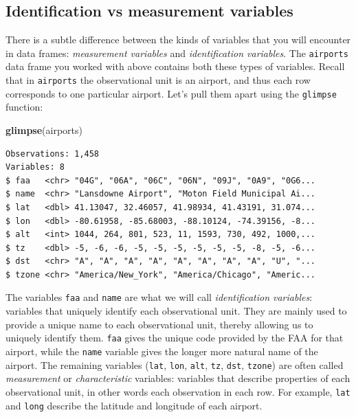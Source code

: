 \documentclass[12pt,]{krantz}
\makeatletter
\newenvironment{Shaded}{\begin{snugshade}}{\end{snugshade}}
\newcommand{\KeywordTok}[1]{\textcolor[rgb]{0.27,0.27,0.27}{\textbf{#1}}}
\newcommand{\NormalTok}[1]{#1}
\newenvironment{kframe}{%
\medskip{}
\setlength{\fboxsep}{.8em}
 \def\at@end@of@kframe{}%
 \ifinner\ifhmode%
  \def\at@end@of@kframe{\end{minipage}}%
  \begin{minipage}{\columnwidth}%
 \fi\fi%
 \def\FrameCommand##1{\hskip\@totalleftmargin \hskip-\fboxsep
 \colorbox{shadecolor}{##1}\hskip-\fboxsep
     \hskip-\linewidth \hskip-\@totalleftmargin \hskip\columnwidth}%
 \MakeFramed {\advance\hsize-\width
   \@totalleftmargin\z@ \linewidth\hsize
   \@setminipage}}%
 {\par\unskip\endMakeFramed%
 \at@end@of@kframe}
\renewenvironment{Shaded}{\begin{kframe}}{\end{kframe}}
\theoremstyle{definition}
\theoremstyle{definition}
\theoremstyle{definition}
\theoremstyle{remark}
\makeatother
\begin{document}
\subsection{Identification vs measurement
variables}\label{identification-vs-measurement}

There is a subtle difference between the kinds of variables that you
will encounter in data frames: \emph{measurement variables} and
\emph{identification variables}. The \texttt{airports} data frame you
worked with above contains both these types of variables. Recall that in
\texttt{airports} the observational unit is an airport, and thus each
row corresponds to one particular airport. Let's pull them apart using
the \texttt{glimpse} function:

\begin{Shaded}
\begin{Highlighting}[]
\KeywordTok{glimpse}\NormalTok{(airports)}
\end{Highlighting}
\end{Shaded}

\begin{verbatim}
Observations: 1,458
Variables: 8
$ faa   <chr> "04G", "06A", "06C", "06N", "09J", "0A9", "0G6...
$ name  <chr> "Lansdowne Airport", "Moton Field Municipal Ai...
$ lat   <dbl> 41.13047, 32.46057, 41.98934, 41.43191, 31.074...
$ lon   <dbl> -80.61958, -85.68003, -88.10124, -74.39156, -8...
$ alt   <int> 1044, 264, 801, 523, 11, 1593, 730, 492, 1000,...
$ tz    <dbl> -5, -6, -6, -5, -5, -5, -5, -5, -5, -8, -5, -6...
$ dst   <chr> "A", "A", "A", "A", "A", "A", "A", "A", "U", "...
$ tzone <chr> "America/New_York", "America/Chicago", "Americ...
\end{verbatim}

The variables \texttt{faa} and \texttt{name} are what we will call
\emph{identification variables}: variables that uniquely identify each
observational unit. They are mainly used to provide a unique name to
each observational unit, thereby allowing us to uniquely identify them.
\texttt{faa} gives the unique code provided by the FAA for that airport,
while the \texttt{name} variable gives the longer more natural name of
the airport. The remaining variables (\texttt{lat}, \texttt{lon},
\texttt{alt}, \texttt{tz}, \texttt{dst}, \texttt{tzone}) are often
called \emph{measurement} or \emph{characteristic} variables: variables
that describe properties of each observational unit, in other words each
observation in each row. For example, \texttt{lat} and \texttt{long}
describe the latitude and longitude of each airport.
\end{document}
